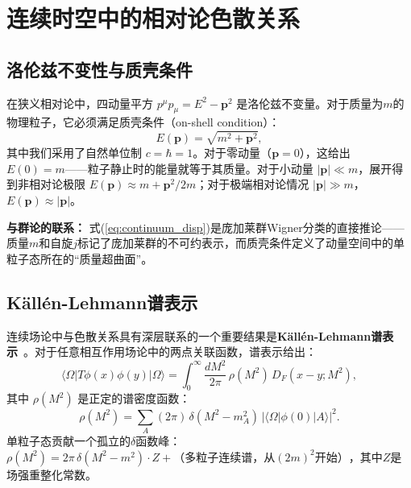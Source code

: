 \documentclass[12pt,a4paper]{ctexart}
\theoremstyle{definition}
\begin{document}
\section{连续时空中的相对论色散关系}

\subsection{洛伦兹不变性与质壳条件}

在狭义相对论中，四动量平方 $p^\mu p_\mu = E^2 - \mathbf{p}^2$ 是洛伦兹不变量。对于质量为$m$的物理粒子，它必须满足质壳条件（on-shell condition）：
\begin{equation}\label{eq:continuum_disp}
    E(\mathbf{p}) = \sqrt{m^2 + \mathbf{p}^2},
\end{equation}
其中我们采用了自然单位制 $c = \hbar = 1$。对于零动量（$\mathbf{p} = 0$），这给出 $E(0) = m$——粒子静止时的能量就等于其质量。对于小动量 $|\mathbf{p}| \ll m$，展开得到非相对论极限 $E(\mathbf{p}) \approx m + \mathbf{p}^2/2m$；对于极端相对论情况 $|\mathbf{p}| \gg m$，$E(\mathbf{p}) \approx |\mathbf{p}|$。

\textbf{与群论的联系：} 式(\ref{eq:continuum_disp})是庞加莱群Wigner分类的直接推论——质量$m$和自旋$j$标记了庞加莱群的不可约表示，而质壳条件定义了动量空间中的单粒子态所在的``质量超曲面''。

\subsection{K\"all\'en-Lehmann谱表示}

连续场论中与色散关系具有深层联系的一个重要结果是\textbf{K\"all\'en-Lehmann谱表示}~\cite{PeskinSchroeder1995}。对于任意相互作用场论中的两点关联函数，谱表示给出：
\begin{equation}\label{eq:KL}
    \langle\Omega| T\phi(x)\phi(y) |\Omega\rangle = \int_0^\infty \frac{dM^2}{2\pi}\,\rho(M^2)\, D_F(x-y; M^2),
\end{equation}
其中 $\rho(M^2)$ 是正定的谱密度函数：
\begin{equation}\label{eq:spectral_density}
    \rho(M^2) = \sum_A (2\pi)\,\delta(M^2 - m_A^2)\,|\langle\Omega|\phi(0)|A\rangle|^2.
\end{equation}
单粒子态贡献一个孤立的$\delta$函数峰：$\rho(M^2) = 2\pi\,\delta(M^2 - m^2)\cdot Z + \text{（多粒子连续谱，从}(2m)^2\text{开始）}$，其中$Z$是场强重整化常数。
\end{document}
